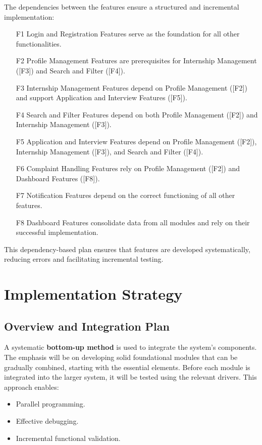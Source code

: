The dependencies between the features ensure a structured and incremental implementation:
\begin{enumerate}
    \item [F1] Login and Registration Features serve as the foundation for all other functionalities.
    \item [F2] Profile Management Features are prerequisites for Internship Management ([F3]) and Search and Filter ([F4]).
    \item [F3] Internship Management Features depend on Profile Management ([F2]) and support Application and Interview Features ([F5]).
    \item [F4] Search and Filter Features depend on both Profile Management ([F2]) and Internship Management ([F3]).
    \item [F5] Application and Interview Features depend on Profile Management ([F2]), Internship Management ([F3]), and Search and Filter ([F4]).
    \item [F6] Complaint Handling Features rely on Profile Management ([F2]) and Dashboard Features ([F8]).
    \item [F7] Notification Features depend on the correct functioning of all other features.
    \item [F8] Dashboard Features consolidate data from all modules and rely on their successful implementation.
\end{enumerate}

This dependency-based plan ensures that features are developed systematically, reducing errors and facilitating incremental testing.

\section{Implementation Strategy}
\label{subsec:implementation_strategy}

\subsection{Overview and Integration Plan}
\label{subsubsec:integration_plan}

A systematic \textbf{bottom-up method} is used to integrate the system's components. The emphasis will be on developing solid foundational modules that can be gradually combined, starting with the essential elements. Before each module is integrated into the larger system, it will be tested using the relevant drivers. This approach enables:
\begin{itemize}
    \item Parallel programming.
    \item Effective debugging.
    \item Incremental functional validation.
\end{itemize}

